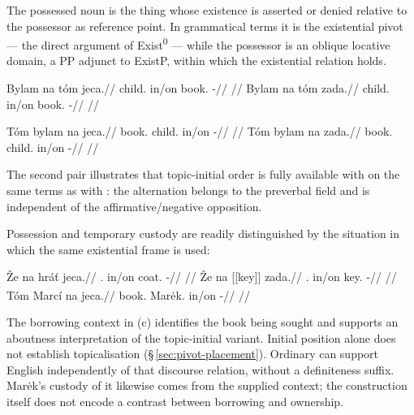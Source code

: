 \noindent The possessed noun is the thing whose existence is asserted or denied
relative to the possessor as reference point. In grammatical terms it is the
existential pivot --- the direct argument of Exist\textsuperscript{0} --- while
the possessor is an oblique locative domain, a PP adjunct to ExistP, within
which the existential relation holds.

\pex
\a
\begingl
\gla Bylam na tóm jeca.//
\glb child.\Ind{} in/on book.\Dir{} \Exst{}-\Cont{}//
\glft {}//
\endgl
\a
\begingl
\gla Bylam na tóm zada.//
\glb child.\Ind{} in/on book.\Dir{} \NegExst{}-\Cont{}//
\glft {}//
\endgl
\xe

\pex
\a
\begingl
\gla Tóm bylam na jeca.//
\glb book.\Dir{} child.\Ind{} in/on \Exst{}-\Cont{}//
\glft {}//
\endgl
\a
\begingl
\gla Tóm bylam na zada.//
\glb book.\Dir{} child.\Ind{} in/on \NegExst{}-\Cont{}//
\glft {}//
\endgl
\xe

\noindent The second pair illustrates that topic-initial order is fully
available with  on the same terms as with : the alternation
belongs to the preverbal field and is independent of the affirmative/negative
opposition.

Possession and temporary custody are readily distinguished by the situation
in which the same existential frame is used:

\pex\label{ex:predicate-everyday-possession}
\a
\begingl
\gla Že na hráť jeca.//
\Sg{}.\Ind{} in/on coat.\Dir{} \Exst{}-\Cont{}//
\glft {}
//
\endgl
\a
\begingl
\gla Že na \textnormal{[[key]]}\textsubscript{\Dir{}} zada.//
\Sg{}.\Ind{} in/on key.\Dir{} \NegExst{}-\Cont{}//
\glft {}
//
\endgl
\a
\begingl
\gla Tóm Marcí na jeca.//
\glb book.\Dir{} Marėk.\Ind{} in/on \Exst{}-\Cont{}//
\glft {}
//
\endgl
\xe

The borrowing context in (c) identifies the book being sought and supports
an aboutness interpretation of the topic-initial variant. Initial position
alone does not establish topicalisation (§\,\ref{sec:pivot-placement}).
Ordinary  can support English  independently of
that discourse relation, without a definiteness suffix. Marėk's custody of it likewise comes from the supplied context;
the construction itself does not encode a contrast between borrowing and
ownership.

